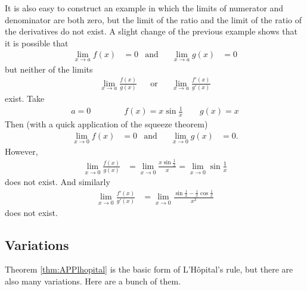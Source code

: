 It is also easy to construct an example in which the limits of numerator and denominator
are both zero, but the limit of the ratio and the limit of the ratio of the derivatives
do not exist. A slight change of the previous example shows that it is possible that
\begin{align*}
\lim\limits_{x\rightarrow a}f(x) &=0
& \text{and}&&
\lim\limits_{x\rightarrow a}g(x) &= 0
\end{align*}
but neither of the limits
\begin{align*}
\lim\limits_{x\rightarrow a}\frac{f(x)}{g(x)} && \text{or}&&
\lim\limits_{x\rightarrow a}\frac{f'(x)}{g'(x)}
\end{align*}
exist. Take
\begin{align*}
a=0\qquad   \qquad f(x)=x\sin\frac{1}{x} \qquad g(x)= x
\end{align*}
Then (with a quick application of the squeeze theorem)
\begin{align*}
  \lim_{x\to 0} f(x) &= 0 & \text{and}&&
  \lim_{x\to 0} g(x) &= 0.
\end{align*}
However,
\begin{align*}
\lim_{x\rightarrow 0}\frac{f(x)}{g(x)}
&=\lim_{x\rightarrow 0}\frac{x\sin\frac{1}{x} }{x}
=\lim_{x\rightarrow 0} \sin\frac{1}{x}
\end{align*}
does not exist. And similarly
\begin{align*}
  \lim_{x\rightarrow 0}\frac{f'(x)}{g'(x)}
  &= \lim_{x\to 0} \frac{\sin\frac{1}{x} - \frac{1}{x}\cos\frac{1}{x} }{x^2}
\end{align*}
does not exist.


\subsection{Variations}\label{ssec_3_7_2}
Theorem \ref{thm:APPlhopital} is the basic form of L'H\^opital's
rule, but there are also many variations. Here are a bunch of them.

